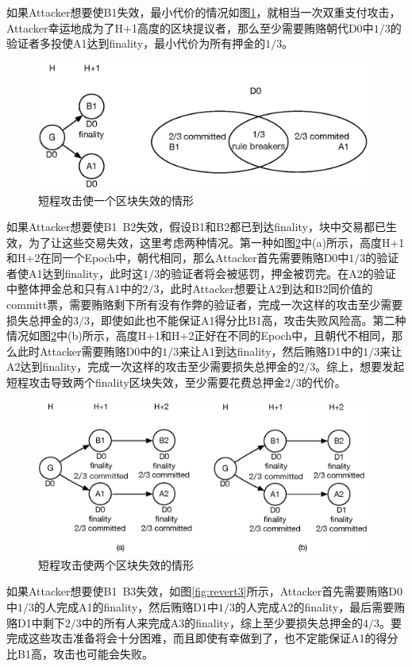 如果Attacker想要使B1失效，最小代价的情况如图\ref{fig:revert1}，就相当一次双重支付攻击，Attacker幸运地成为了H+1高度的区块提议者，那么至少需要贿赂朝代D0中$1/3$的验证者多投使A1达到finality，最小代价为所有押金的$1/3$。

\begin{figure}[h]
\centering
\includegraphics[width=11cm]{./figs/revert1}
\caption{短程攻击使一个区块失效的情形}
\label{fig:revert1}
\end{figure}

如果Attacker想要使B1~B2失效，假设B1和B2都已到达finality，块中交易都已生效，为了让这些交易失效，这里考虑两种情况。第一种如图\ref{fig:revert2}中(a)所示，高度H+1和H+2在同一个Epoch中，朝代相同，那么Attacker首先需要贿赂D0中$1/3$的验证者使A1达到finality，此时这$1/3$的验证者将会被惩罚，押金被罚完。在A2的验证中整体押金总和只有A1中的$2/3$，此时Attacker想要让A2到达和B2同价值的committ票，需要贿赂剩下所有没有作弊的验证者，完成一次这样的攻击至少需要损失总押金的$3/3$，即使如此也不能保证A1得分比B1高，攻击失败风险高。第二种情况如图\ref{fig:revert2}中(b)所示，高度H+1和H+2正好在不同的Epoch中，且朝代不相同，那么此时Attacker需要贿赂D0中的$1/3$来让A1到达finality，然后贿赂D1中的$1/3$来让A2达到finality，完成一次这样的攻击至少需要损失总押金的$2/3$。综上，想要发起短程攻击导致两个finality区块失效，至少需要花费总押金$2/3$的代价。

\begin{figure}[h]
\centering
\includegraphics[width=11cm]{./figs/revert2}
\caption{短程攻击使两个区块失效的情形}
\label{fig:revert2}
\end{figure}


如果Attacker想要使B1~B3失效，如图\ref{fig:revert3}所示，Attacker首先需要贿赂D0中$1/3$的人完成A1的finality，然后贿赂D1中$1/3$的人完成A2的finality，最后需要贿赂D1中剩下$2/3$中的所有人来完成A3的finality，综上至少要损失总押金的$4/3$。要完成这些攻击准备将会十分困难，而且即使有幸做到了，也不定能保证A1的得分比B1高，攻击也可能会失败。

